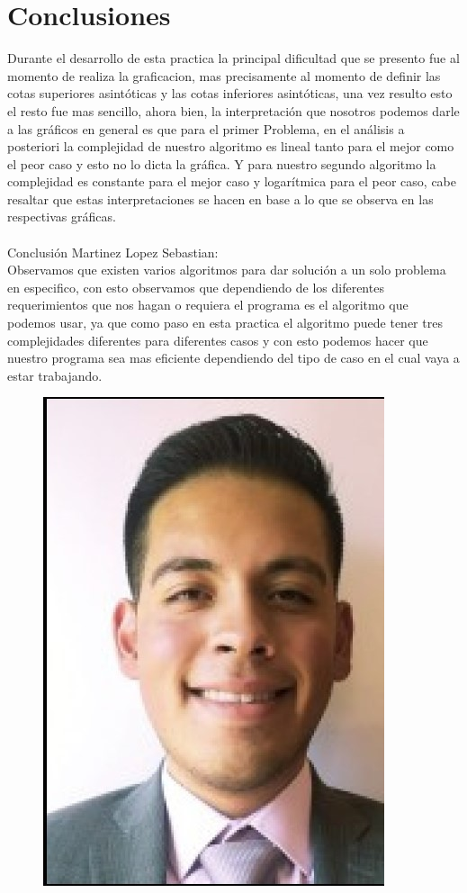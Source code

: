 \documentclass[12pt,twoside]{article}
\begin{document}
\section{Conclusiones}
Durante el desarrollo de esta practica la principal dificultad que se presento fue al momento de realiza la graficacion, mas precisamente al momento de definir las cotas superiores asintóticas y las cotas inferiores asintóticas, una vez resulto esto el resto fue mas sencillo, ahora bien, la interpretación que nosotros podemos darle a las gráficos en general es que para el primer Problema, en el análisis a posteriori la complejidad de nuestro algoritmo es lineal tanto para el mejor como el peor caso y esto no lo dicta la gráfica. Y para nuestro segundo algoritmo la complejidad es constante para el mejor caso y logarítmica para el peor caso, cabe resaltar que estas interpretaciones se hacen en base a lo que se observa en las respectivas gráficas. 
\\
\\
Conclusión Martinez Lopez Sebastian:\\
Observamos que existen varios algoritmos para dar solución a un solo problema en especifico, con esto observamos que dependiendo de los diferentes requerimientos que nos hagan o requiera el programa es el algoritmo que podemos usar, ya que como paso en esta practica el algoritmo puede tener tres complejidades diferentes para diferentes casos y con esto podemos hacer que nuestro programa sea mas eficiente dependiendo del tipo de caso en el cual vaya a estar trabajando. 
\begin{figure}[h!]
\centering
\includegraphics[scale=0.7]{seb1.jpg}
\caption{}
\label{fig:universe}
\end{figure}
\end{document}
